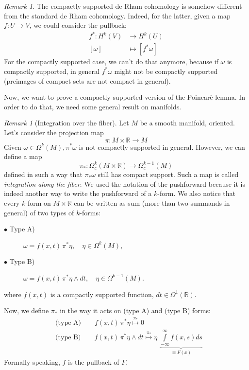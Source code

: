 \documentclass[a4paper,11pt,titlepage, article, oneside]{memoir}
\numberwithin{equation}{section}
\theoremstyle{definition}
\theoremstyle{remark}
\newtheorem{remark}[theorem]{Remark}
\newcommand{\rfield}{\mathbb{R}}
\begin{document}
\begin{remarkbox}
\begin{remark}
The compactly supported de Rham cohomology is somehow different from the standard de Rham cohomology. Indeed, for the latter, given a map $f \colon U \rightarrow V$, we could consider the pullback:
\begin{align*}
f^* \colon H^k(V) &\rightarrow H^k(U) \\
[\omega] &\mapsto [f^* \omega]
\end{align*}
For the compactly supported case, we can't do that anymore, because if $\omega$ is compactly supported, in general $f^* \omega$ might not be compactly supported (preimages of compact sets are not compact in general).
\end{remark}
\end{remarkbox}

Now, we want to prove a compactly supported version of the Poincarè lemma. In order to do that, we need some general result on manifolds.

\begin{remarkbox}
\begin{remark}[Integration over the fiber] \label{intfiberrem}
Let $M$ be a smooth manifold, oriented. Let's consider the projection map
\begin{equation}
\pi \colon M \times \rfield \rightarrow M
\end{equation}
Given $\omega \in \Omega^k(M), \pi^*\omega$ is not compactly supported in general. However, we can define a map 
\begin{equation}
\pi_* \colon \Omega_c^k(M \times \rfield) \rightarrow \Omega_c^{k-1}(M)
\end{equation}
defined in such a way that $\pi_* \omega$ still has compact support. Such a map is called \textit{integration along the fiber}. We used the notation of the pushforward because it is indeed another way to write the pushforward of a $k$-form. 
We also notice that every $k$-form on $M \times \rfield$ can be written as sum (more than two summands in general) of two types of $k$-forms:
\begin{description}
\item[$\bullet $ Type A)] $\omega = f(x, t) \, \pi^* \eta, \quad \eta \in \Omega^k(M)$,
\item[$\bullet$ Type B)] $\omega = f(x, t)\, \pi^*\eta \wedge dt, \quad \eta \in \Omega^{k-1}(M)$.
\end{description}
where $f(x, t)$ is a compactly supported function, $dt \in \Omega^1(\rfield)$.

Now, we define $\pi_*$ in the way it acts on (type A) and (type B) forms:
\begin{align}
&\text{(type A)} \qquad  f(x, t) \, \pi^* \eta \overset{\pi_*}{\longmapsto}  0  \label{typea} \\
&\text{(type B)}\qquad  f(x,t) \, \pi^*\eta \wedge dt \overset{\pi_*}{\longmapsto} \eta \, \,  \underbrace{\int\limits_{-\infty}^{\infty} f(x, s) ds }_{\equiv F(x)}  \label{typeb} 
\end{align}
Formally speaking, $f$ is the pullback of $F$.
\end{remark}
\end{remarkbox}
\end{document}
